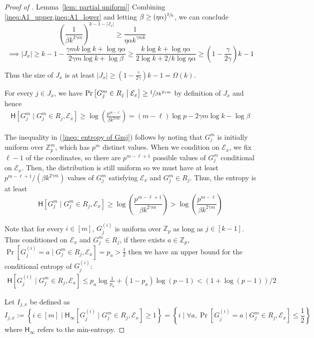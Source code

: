 \documentclass[11pt]{article}
\numberwithin{equation}{section}
\theoremstyle{definition}
\theoremstyle{plain}
\newcommand{\Z}{\mathbb Z}
\newcommand{\expref}[2]{\hyperref[#2]{#1~\ref{#2}}}
\newcommand{\set}[1]{{\left \{{#1} \right \}}}
\newcommand{\st}{\;|\;}
\newcommand{\cond}{\;|\;}
\newcommand{\bigomega}[1]{\ensuremath{{\Omega \left( {#1} \right)}}}
\newcommand{\eqdef}{\ensuremath{:=}}
\newcommand{\entropy}{\ensuremath{\mathsf{H}}}
\newcommand{\Hmin}{\ensuremath{\mathsf{H}_{\infty}}}
\newcommand{\event}{\ensuremath{\mathcal{E}}}
\begin{document}
\begin{proof}[Proof of \expref{Lemma}{lem: partial uniform}]
		Combining \cref{ineq:A1_upper,ineq:A1_lower} 
and letting $\beta\ge (\eta\alpha)^{\sfrac{2}{k}}$, we can conclude
%
\[\left( \frac{1}{\beta k^{2\gamma m}} \right)^{k-1-|J_x|}\ge  \frac{1}{\eta\alpha k^{\gamma mk}} \qquad\qquad\qquad\qquad \]
\[ \implies |J_x|\ge k-1-\frac{\gamma mk\log k+ \log \eta\alpha}{2\gamma m\log k + \log \beta} \ge \frac{k \log k + \log \eta \alpha}{2 \log k + 2/k  \log \eta \alpha} \ge \left(1-\frac{\gamma}{2\gamma}\right)k-1\]

		Thus the size of $J_x$ is at least
		 $|J_x|\ge \left(1-\frac{\gamma}{2\gamma}\right)k-1=\bigomega{k}$.

		For every $j\in J_x$, we have $\Pr\left[G^m_j\in R_j\; \big| \; \event_x\right] \ge \sfrac{1}{\beta k^{2\gamma m}}$ by definition of $J_x$
		and hence 
		\begin{align}\label{ineq: entropy of Gmj}
		\entropy\left[ G^m_j \cond G^m_j\in R_j,\event_x \right] \ge \log\left( \frac{p^{m-\ell}}{\beta k^{2\gamma m}} \right)=(m-\ell)\log p - 2\gamma m\log k - \log \beta
		\end{align}
		
		{\color{black}The inequality in (\ref{ineq: entropy of Gmj}) follows by noting that $G^m_j$ is initially uniform over $\Z_p^m$, which has $p^m$ distinct values. When we condition on $\event_x$, we fix $\ell-1$ of the coordinates, so there are $p^{m-\ell+1}$ possible values of $G^m_j$ conditional on $\event_x$. Then, the distribution is still uniform so we must have at least $p^{m-\ell+1}/\left(\beta k^{2\gamma m}\right)$
		values of $G_j^m$ satisfying $\event_x$ and $G_j^m \in R_j$. Thus, the entropy is at least
		$$\entropy\left[ G^m_j \cond G^m_j\in R_j,\event_x \right] \ge \log\left( \frac{p^{m-\ell+1}}{\beta k^{2\gamma m}} \right) > \log\left( \frac{p^{m-\ell}}{\beta k^{2\gamma m}} \right)$$} 

		Note that for every $i\in[m]$, $G_j^{(i)}$ is uniform over $\Z_p$ as long as $j\in [k-1]$.
		Thus conditioned on $\event_x$ and $G_j^m\in R_j$,
		if there exists $a\in\Z_p$, 
		$\Pr[G_j^{(i)}=a \cond G_j^m\in R_j,\event_x ]=p_a>\frac{1}{2}$ 
		then we have an upper bound for the conditional entropy of $G_j^{(i)} $: 
		\begin{align*}%
			\entropy[G_j^{(i)}\cond G_j^m\in R_j,\event_x ]\le p_a\log\frac{1}{p_a}+(1-p_a)\log(p-1)< (1+\log(p-1))/2
		\end{align*}

		Let $I_{j,x}$ be defined as 
		\[I_{j,x}\eqdef\set{i\in [m] \st \Hmin\left[ G_j^{(i)}\cond G_j^m\in R_j,\event_x  \right]\ge 1 } = \set{i \st \forall a, \Pr\left[ G_j^{(i)}=a\cond G_j^m\in R_j,\event_x  \right]\le \frac{1}{2} }\]
		{\color{black}where $\Hmin$ refers to the min-entropy.} %
		

\end{proof}
\end{document}
